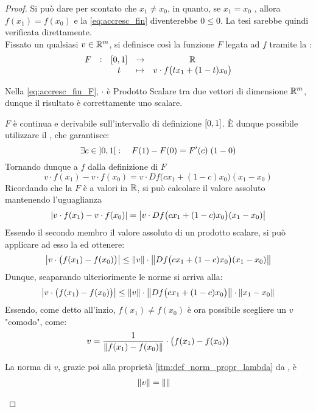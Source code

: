 \begin{theorem}
\begin{note}
	\end{note}
	\begin{proof}
		Si può dare per scontato che $x_1 \neq x_0$, in quanto, se $x_1 = x_0$ , allora $f(x_1) = f(x_0)$ e la \cref{eq:accresc_fin} diventerebbe $0 \leq 0$. La tesi sarebbe quindi verificata direttamente.\\
		Fissato un qualsiasi $v \in \mathbb{R}^m$, si definisce così la funzione $F$ legata ad $f$ tramite la :
		\begin{equation}
			\label{eq:accresc_fin_F}
			\begin{array}{ccccc} {F} & : & {\left[0,1\right]} & \to & {\mathbb{R}} \\ & & {t} & \mapsto & {v \cdot f \bigl( t x_1 + (1-t)x_0 \bigr)} \\ \end{array}
		\end{equation}
		\begin{note}
			Nella \cref{eq:accresc_fin_F},  $\cdot$  è Prodotto Scalare tra due vettori di dimensione $\mathbb{R}^m$, dunque il risultato è correttamente uno scalare.
		\end{note}
		$F$ è continua e derivabile sull'intervallo di definizione $\left[0,1\right]$. È dunque possibile utilizzare il , che garantisce:
		\[\exists c \in \left]0,1\right[: \quad F(1) - F(0) = F'(c) \; (1-0)\]
		Tornando dunque a $f$ dalla definizione di $F$
		\[v \cdot f(x_1) - v \cdot f(x_0) = v \cdot Df\bigl( cx_1 + (1-c)x_0 \bigr) (x_1 - x_0)\]
		Ricordando che la $F$ è a valori in $\mathbb{R}$, si può calcolare il valore assoluto mantenendo l'uguaglianza
		\[\left|v \cdot f(x_1) - v \cdot f(x_0)\right| = \left|v \cdot Df\bigl( cx_1 + (1-c)x_0 \bigr) (x_1 - x_0)\right|\]
		Essendo il secondo membro il valore assoluto di un prodotto scalare, si può applicare ad esso la  ed ottenere: 
		\[\left|v \cdot \bigl( f(x_1) - f(x_0) \bigr)\right| \leq \left\|v\right\| \cdot \left\|Df\bigl( cx_1 + (1-c)x_0 \bigr) (x_1 - x_0)\right\|\]
		Dunque, seaparando ulteriorimente le norme si arriva alla:
		\begin{equation}
			\label{eq:accr_fin_norm}
			\left|v \cdot \bigl( f(x_1) - f(x_0) \bigr)\right| \leq \left\|v\right\| \cdot \left\|Df\bigl( cx_1 + (1-c)x_0 \bigr)\right\| \cdot \left\|x_1 - x_0\right\|
		\end{equation}
		Essendo, come detto all'inzio, $f(x_1) \neq f(x_0)$ è ora possibile scegliere un $v$ "comodo", come:
		\[v = \frac{1}{\left\|f(x_1) - f(x_0)\right\|} \cdot \bigl( f(x_1) - f(x_0) \bigr)\]
		\begin{note}
			La norma di $v$, grazie poi alla proprietà \ref{itm:def_norm_propr_lambda} da , è
			\begin{align*}
				\left\|v\right\| &= \left\|
\right\|
\end{align*}
\end{note}
\end{proof}
\end{theorem}
